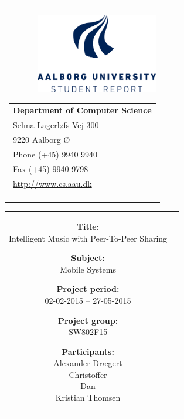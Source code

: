 \begin{nopagebreak}
	{\samepage 
		\begin{tabular}{r}
			\parbox{16cm}
			{\raisebox{11mm}
				{\includegraphics[height=3.5cm]{Content/TitlePage/aauIcon.png}}
				\hfill \parbox{8.5cm}{\vspace{-5cm}
				\begin{tabular}{l}
					{\small \textbf{Department of Computer Science}}\\
					{\small Selma Lagerløfs Vej 300} \\
					{\small 9220 Aalborg Ø} \\
					{\small Phone (+45) 9940 9940} \\
					{\small Fax (+45) 9940 9798} \\
					{\small \url{http://www.cs.aau.dk}}
				\end{tabular}}
			}
		\end{tabular}
		
		\begin{tabular}{cc}
			\parbox{7cm}{
				\begin{description}
					\item {\textbf{Title:}} \\
						Intelligent Music with Peer-To-Peer Sharing\\
					
					\item {\textbf{Subject:}} \\
						Mobile Systems\\	
						
					\item {\textbf{Project period:}}\\
						  02-02-2015 -- 27-05-2015\\

					\item {\textbf{Project group:}}\\
						  SW802F15\\
			
					\item {\textbf{Participants:}}\\
						Alexander Drægert\\
						Christoffer\\
						Dan\\
						Kristian Thomsen \\
						  

\end{description}}
\end{tabular}}
\end{nopagebreak}
